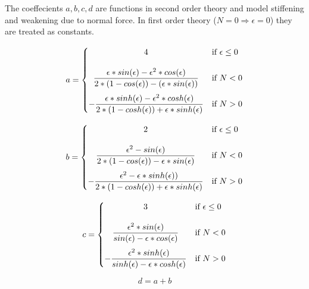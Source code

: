 The coeffecients $a, b, c ,d$ are functions in second order theory and model stiffening and weakening due to normal force.
In first order theory ($N = 0 \Rightarrow \epsilon = 0$) they are treated as constants.

\begin{equation} \label{a}
    a = \begin{cases}
            \hfil 4              & \text{if } \epsilon \leq 0\\[1.2em]
            \hfil \dfrac{\epsilon * sin(\epsilon) - \epsilon^2 * cos(\epsilon)}{2 * (1 - cos(\epsilon)) - (\epsilon * sin(\epsilon))}               & \text{if } N < 0          \\[1.2em]
            -\dfrac{\epsilon * sinh(\epsilon) - \epsilon^2 * cosh(\epsilon)}{2 * (1 - cosh(\epsilon)) + \epsilon * sinh(\epsilon)}               & \text{if } N > 0
        \end{cases}
\end{equation}

\begin{equation} \label{b}
    b = \begin{cases}
            \hfil 2              & \text{if } \epsilon \leq 0\\[1.2em]
            \hfil \dfrac{\epsilon^2 - sin(\epsilon)}{2*(1 - cos(\epsilon)) - \epsilon * sin(\epsilon) }               & \text{if } N < 0          \\[1.2em]
            -\dfrac{\epsilon^2 - \epsilon * sinh(\epsilon))}{2 * (1 - cosh(\epsilon)) + \epsilon * sinh(\epsilon)}               & \text{if } N > 0
        \end{cases}
\end{equation}

\begin{equation} \label{c}
    c = \begin{cases}
            \hfil 3              & \text{if } \epsilon \leq 0\\[1.2em]
            \hfil \dfrac{\epsilon^2 * sin(\epsilon)}{sin(\epsilon) - \epsilon * cos(\epsilon)}               & \text{if } N < 0          \\[1.2em]
            -\dfrac{\epsilon^2 * sinh(\epsilon)}{sinh(\epsilon) - \epsilon * cosh(\epsilon)}               & \text{if } N > 0
        \end{cases}
\end{equation}

\begin{equation} \label{d}
    d = a + b
\end{equation}

